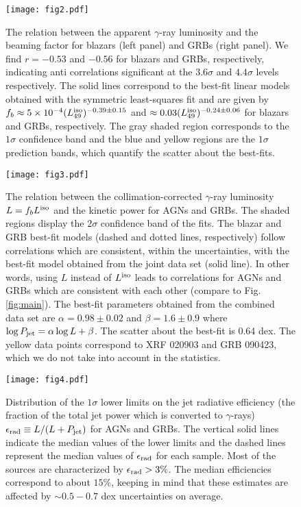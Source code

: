 \documentclass[12pt]{article}
\begin{document}
\begin{figure}[!t]
\centering
\texttt{[image: fig2.pdf]}	%
\caption{The relation between the apparent $\gamma$-ray luminosity and the beaming factor for blazars (left panel) and GRBs (right panel). 
%
We find $r=-0.53$ and $-0.56$ for blazars and GRBs, respectively, indicating anti correlations significant at the $3.6\sigma$ and $4.4\sigma$ levels respectively. The solid lines correspond to the best-fit linear models obtained with the symmetric least-squares fit and are given by $f_b \approx 5 \times 10^{-4} (L_{49}^{\rm iso})^{-0.39 \pm 0.15}$ and $\approx 0.03 (L_{49}^{\rm iso})^{-0.24 \pm 0.06}$ for blazars and GRBs, respectively.
%
The gray shaded region corresponds to the $1\sigma$ confidence band and the blue and yellow regions are the $1\sigma$ prediction bands, which quantify the scatter about the best-fits.}
\label{fig:beaming}
\end{figure}


\begin{figure}[!t]
\centering
\texttt{[image: fig3.pdf]}	%
\caption{The relation between the collimation-corrected $\gamma$-ray luminosity $L=f_b L^{\rm iso}$ and the kinetic power for AGNs and GRBs. The shaded regions display the $2\sigma$ confidence band of the fits. 
%
The blazar and GRB best-fit models (dashed and dotted lines, respectively) follow correlations which are consistent, within the uncertainties, with the best-fit model obtained from the joint data set (solid line). In other words, using $L$ instead of $L^{\rm iso}$ leads to correlations for AGNs and GRBs which are consistent with each other (compare to Fig. \ref{fig:main}). The best-fit parameters obtained from the combined data set are $\alpha=0.98 \pm 0.02$ and $\beta=1.6 \pm 0.9$ where $\log P_{\rm jet} = \alpha \log L + \beta$. The scatter about the best-fit is 0.64 dex.  
%
The yellow data points correspond to XRF 020903 and GRB 090423, which we do not take into account in the statistics.}
\label{fig:debeam}
\end{figure}


\begin{figure}
\centering
\texttt{[image: fig4.pdf]}	%
\caption{Distribution of the $1\sigma$ lower limits on the jet radiative efficiency (the fraction of the total jet power which is converted to $\gamma$-rays) $\epsilon_{\rm rad} \equiv L/(L+P_{\rm jet})$ for AGNs and GRBs. The vertical solid lines indicate the median values of the lower limits and the dashed lines represent the median values of $\epsilon_{\rm rad}$ for each sample. Most of the sources are characterized by $\epsilon_{\rm rad} > 3\%$. The median efficiencies correspond to about $15\%$, keeping in mind that these estimates are affected by $\sim 0.5-0.7$ dex uncertainties on average. }
\label{fig:eff}
\end{figure}
\end{document}

